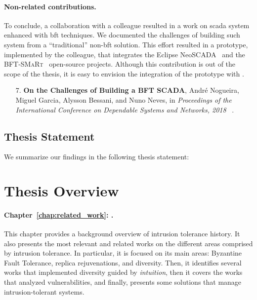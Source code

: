 \paragraph{Non-related contributions.}
To conclude, a collaboration with a colleague resulted in a work on \gls{scada} system enhanced with \gls{bft} techniques. 
We documented the challenges of building such system from a ``traditional'' non-\gls{bft} solution.
This effort resulted in a prototype, implemented by the colleague, that integrates the Eclipse NeoSCADA~\cite{eclipsescada} and the \textsc{BFT-SMaRt}~\cite{Bessani:2014} open-source projects.
Although this contribution is out of the scope of the thesis, it is easy to envision the integration of the prototype with \system.


\begin{enumerate}

\item[7.] \textbf{On the Challenges of Building a BFT SCADA}, Andr\'{e} Nogueira, Miguel Garcia, Alysson Bessani, and Nuno Neves, in \emph{Proceedings of the International Conference on Dependable Systems and Networks, 2018 }~\cite{Nogueira:2018}.
\end{enumerate}


\subsection{Thesis Statement}
We summarize our findings in the following thesis statement:

\vspace{2mm}

\section{Thesis Overview}
\paragraph{Chapter~\ref{chap:related_work}: .}
This chapter provides a background overview of intrusion tolerance history. 
It also presents the most relevant and related works on the different areas comprised by intrusion tolerance.
In particular, it is focused on its main areas: Byzantine Fault Tolerance, replica rejuvenations, and diversity.
Then, it identifies several works that implemented diversity guided by \emph{intuition}, then it covers the works that analyzed vulnerabilities, and finally, presents some solutions that manage intrusion-tolerant systems.


